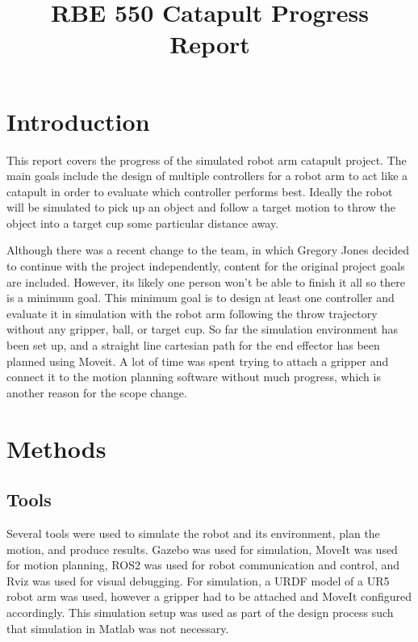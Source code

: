 \documentclass[conference]{IEEEtran}
\begin{document}
\title{RBE 550 Catapult Progress Report}

\author{
}

\maketitle

\section{Introduction}
This report covers the progress of the simulated robot arm catapult project. The
main goals include the design of multiple controllers for a robot arm to act
like a catapult in order to evaluate which controller performs best. Ideally the
robot will be simulated to pick up an object and follow a target motion to throw
the object into a target cup some particular distance away.

Although there was a recent change to the team, in which Gregory Jones decided
to continue with the project independently, content for the original project
goals are included. However, its likely one person won't be able to finish it
all so there is a minimum goal. This minimum goal is to design at least one
controller and evaluate it in simulation with the robot arm following the throw
trajectory without any gripper, ball, or target cup. So far the simulation
environment has been set up, and a straight line cartesian path for the end
effector has been planned using Moveit. A lot of time was spent trying to attach
a gripper and connect it to the motion planning software without much progress,
which is another reason for the scope change.

\section{Methods}

\subsection{Tools}
Several tools were used to simulate the robot and its environment, plan the
motion, and produce results. Gazebo was used for simulation, MoveIt was used for
motion planning, ROS2 was used for robot communication and control, and Rviz was
used for visual debugging. For simulation, a URDF model of a UR5 robot arm was
used, however a gripper had to be attached and MoveIt configured
accordingly. This simulation setup was used as part of the design process such
that simulation in Matlab was not necessary.
\end{document}
